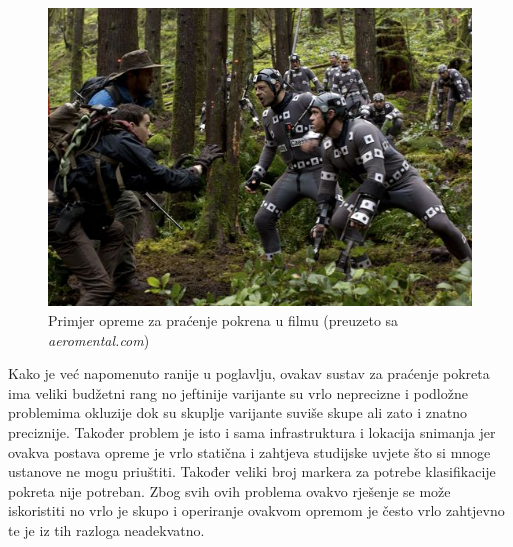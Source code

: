 \documentclass[times, utf8, diplomski]{fer}
\begin{document}
\begin{figure}[h!]
    \includegraphics[width=\textwidth]{planet.jpg}
    \caption{Primjer opreme za praćenje pokrena u filmu (preuzeto sa \textit{aeromental.com})}
    \label{planet}
\end{figure}

Kako je već napomenuto ranije u poglavlju, ovakav sustav za praćenje pokreta ima veliki budžetni rang no jeftinije varijante su
vrlo neprecizne i podložne problemima okluzije dok su skuplje varijante suviše skupe ali zato i znatno preciznije. Također problem
je isto i sama infrastruktura i lokacija snimanja jer ovakva postava opreme je vrlo statična i zahtjeva studijske uvjete što si mnoge
ustanove ne mogu priuštiti. Također veliki broj markera za potrebe klasifikacije pokreta nije potreban. Zbog svih ovih problema ovakvo 
rješenje se može iskoristiti no vrlo je skupo i operiranje ovakvom opremom je često vrlo zahtjevno te je iz tih razloga neadekvatno.
\end{document}
